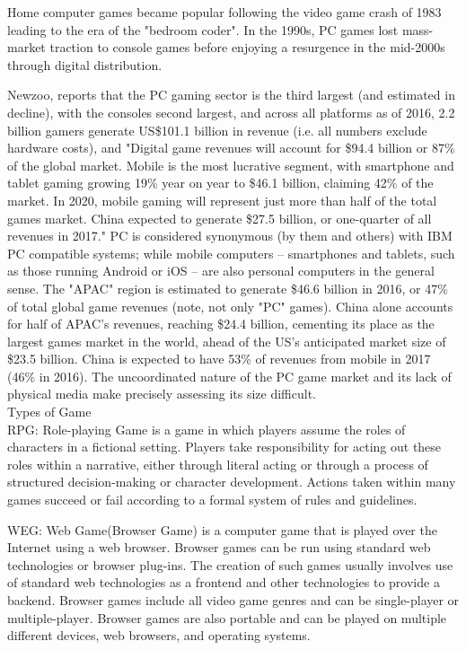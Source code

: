 Home computer games became popular following the video game crash of 1983 leading to the era of the "bedroom coder". In the 1990s, PC games lost mass-market traction to console games before enjoying a resurgence in the mid-2000s through digital distribution.

Newzoo, reports that the PC gaming sector is the third largest (and estimated in decline), with the consoles second largest, and across all platforms as of 2016, 2.2 billion gamers generate US\$101.1 billion in revenue (i.e. all numbers exclude hardware costs), and "Digital game revenues will account for \$94.4 billion or 87\% of the global market. Mobile is the most lucrative segment, with smartphone and tablet gaming growing 19\% year on year to \$46.1 billion, claiming 42\% of the market. In 2020, mobile gaming will represent just more than half of the total games market. China expected to generate \$27.5 billion, or one-quarter of all revenues in 2017." PC is considered synonymous (by them and others) with IBM PC compatible systems; while mobile computers – smartphones and tablets, such as those running Android or iOS – are also personal computers in the general sense. The "APAC" region is estimated to generate \$46.6 billion in 2016, or 47\% of total global game revenues (note, not only "PC" games). China alone accounts for half of APAC's revenues, reaching \$24.4 billion, cementing its place as the largest games market in the world, ahead of the US's anticipated market size of \$23.5 billion. China is expected to have 53\% of revenues from mobile in 2017 (46\% in 2016). The uncoordinated nature of the PC game market and its lack of physical media make precisely assessing its size difficult.\cite{einstein}\\
Types of Game\\
RPG: Role-playing Game is a game in which players assume the roles of characters in a fictional setting. Players take responsibility for acting out these roles within a narrative, either through literal acting or through a process of structured decision-making or character development. Actions taken within many games succeed or fail according to a formal system of rules and guidelines.

WEG: Web Game(Browser Game) is a computer game that is played over the Internet using a web browser. Browser games can be run using standard web technologies or browser plug-ins. The creation of such games usually involves use of standard web technologies as a frontend and other technologies to provide a backend. Browser games include all video game genres and can be single-player or multiple-player. Browser games are also portable and can be played on multiple different devices, web browsers, and operating systems.

